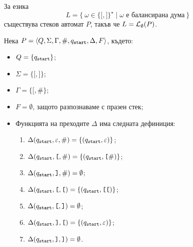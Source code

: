 \begin{example}
  За езика 
  \[L = \{\ \omega \in \{\texttt{[},\texttt{]}\}^\star \mid \omega\text{ е балансирана дума}\ \}\] съществува стеков автомат $P$, такъв че
  $L = \mathcal{L}_\emptyset(P)$.

  Нека $P = \langle{Q,\Sigma,\Gamma,\#,q_{\texttt{start}},\Delta,F}\rangle$, където:
  \begin{itemize}
  \item 
    $Q = \{q_{\texttt{start}}\}$;
  \item
    $\Sigma = \{\texttt{[},\texttt{]}\}$;
  \item
    $\Gamma = \{\texttt{[}, \#\}$;
  \item
    $F = \emptyset$, защото разпознаваме с празен стек;
  \item
    Функцията на преходите $\Delta$ има следната дефиниция:
    \begin{enumerate}[(1)]
    \item 
      $\Delta(q_{\texttt{start}}, \varepsilon, \#) = \{(q_{\texttt{start}}, \varepsilon)\}$;
    \item
      $\Delta(q_{\texttt{start}}, \texttt{[}, \#) = \{(q_{\texttt{start}}, \texttt{[}\#)\}$;
    \item
      $\Delta(q_{\texttt{start}}, \texttt{]}, \#) = \emptyset$;
    \item
      $\Delta(q_{\texttt{start}}, \texttt{[}, \texttt{[}) = \{(q_{\texttt{start}}, \texttt{[[})\}$;
    \item
      $\Delta(q_{\texttt{start}}, \texttt{[}, \texttt{]}) = \emptyset$;
    \item
      $\Delta(q_{\texttt{start}}, \texttt{]}, \texttt{[}) = \{(q_{\texttt{start}}, \varepsilon)\}$;
    \item
      $\Delta(q_{\texttt{start}}, \texttt{]}, \texttt{]}) = \emptyset$.
    \end{enumerate}
  \end{itemize}  


\end{example}
